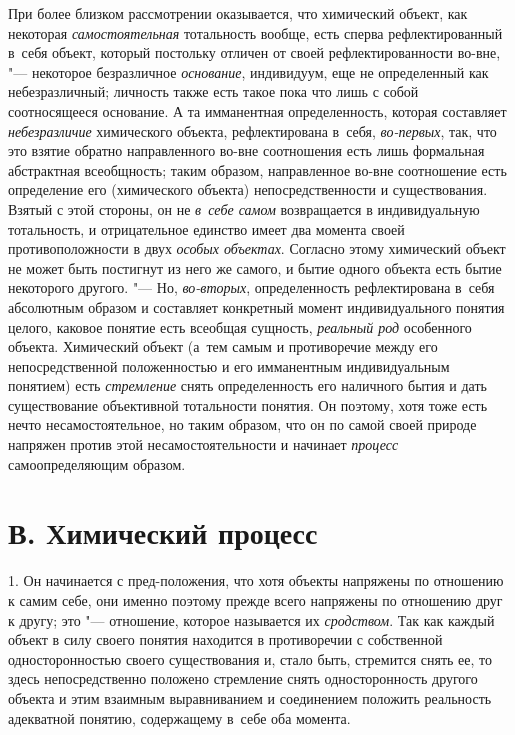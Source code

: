 При более близком рассмотрении оказывается, что химический
объект, как некоторая
{\em самостоятельная}
тотальность вообще, есть сперва рефлектированный в~себя
объект, который постольку отличен от своей рефлектированности во-вне, "---
некоторое безразличное
{\em основание},
индивидуум, еще не определенный как небезразличный; личность
также есть такое пока что лишь с собой соотносящееся
основание.
А та имманентная определенность, которая составляет
{\em небезразличие}
химического объекта, рефлектирована в~себя,
{\em во-первых}, так, что
это взятие обратно направленного во-вне соотношения есть лишь формальная
абстрактная всеобщность; таким образом, направленное во-вне соотношение
есть определение его (химического объекта) непосредственности и
существования. Взятый с этой стороны, он не
{\em в~себе самом}
возвращается в индивидуальную тотальность, и отрицательное
единство имеет два момента своей противоположности в двух
{\em особых объектах}.
Согласно этому химический объект не может быть постигнут из
него же самого, и бытие одного объекта есть бытие некоторого другого. "---
Но, {\em во-вторых},
определенность рефлектирована в~себя абсолютным образом и
составляет конкретный момент индивидуального понятия целого, каковое
понятие есть всеобщая сущность,
{\em реальный род}
особенного объекта. Химический объект (а~тем самым и
противоречие между его непосредственной положенностью и его имманентным
индивидуальным понятием) есть
{\em стремление} снять
определенность его наличного бытия и дать существование объективной
тотальности понятия. Он поэтому, хотя тоже есть нечто несамостоятельное, но
таким образом, что он по самой своей природе напряжен против этой
несамостоятельности и начинает
{\em процесс}
самоопределяющим образом.

\section[В. Химический процесс]{В. Химический процесс}

1. Он начинается с пред-положения, что хотя объекты напряжены
по отношению к самим себе, они именно поэтому прежде всего напряжены по
отношению друг к другу; это "--- отношение, которое называется
их {\em сродством}. Так
как каждый объект в силу своего понятия находится в противоречии с
собственной односторонностью своего существования и, стало быть, стремится
снять ее, то здесь непосредственно положено стремление снять
односторонность другого объекта и этим взаимным выравниванием и соединением
положить реальность адекватной понятию, содержащему в~себе оба момента.

